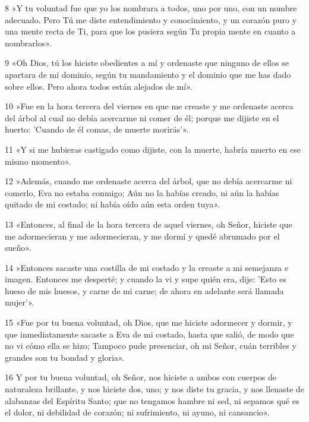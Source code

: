 \par 8 »Y tu voluntad fue que yo los nombrara a todos, uno por uno, con un nombre adecuado. Pero Tú me diste entendimiento y conocimiento, y un corazón puro y una mente recta de Ti, para que los pusiera según Tu propia mente en cuanto a nombrarlos».

\par 9 «Oh Dios, tú los hiciste obedientes a mí y ordenaste que ninguno de ellos se apartara de mi dominio, según tu mandamiento y el dominio que me has dado sobre ellos. Pero ahora todos están alejados de mí».

\par 10 »Fue en la hora tercera del viernes en que me creaste y me ordenaste acerca del árbol al cual no debía acercarme ni comer de él; porque me dijiste en el huerto: 'Cuando de él comas, de muerte morirás'».

\par 11 «Y si me hubieras castigado como dijiste, con la muerte, habría muerto en ese mismo momento».

\par 12 »Además, cuando me ordenaste acerca del árbol, que no debía acercarme ni comerlo, Eva no estaba conmigo; Aún no la habías creado, ni aún la habías quitado de mi costado; ni había oído aún esta orden tuya».

\par 13 «Entonces, al final de la hora tercera de aquel viernes, oh Señor, hiciste que me adormecieran y me adormecieran, y me dormí y quedé abrumado por el sueño».

\par 14 »Entonces sacaste una costilla de mi costado y la creaste a mi semejanza e imagen. Entonces me desperté; y cuando la vi y supe quién era, dije: 'Esto es hueso de mis huesos, y carne de mi carne; de ahora en adelante será llamada mujer'».

\par 15 «Fue por tu buena voluntad, oh Dios, que me hiciste adormecer y dormir, y que inmediatamente sacaste a Eva de mi costado, hasta que salió, de modo que no vi cómo ella se hizo; Tampoco pude presenciar, oh mi Señor, cuán terribles y grandes son tu bondad y gloria».

\par 16 Y por tu buena voluntad, oh Señor, nos hiciste a ambos con cuerpos de naturaleza brillante, y nos hiciste dos, uno; y nos diste tu gracia, y nos llenaste de alabanzas del Espíritu Santo; que no tengamos hambre ni sed, ni sepamos qué es el dolor, ni debilidad de corazón; ni sufrimiento, ni ayuno, ni cansancio».

